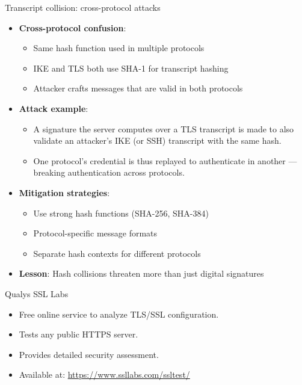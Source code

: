 \ifdefined\PRESENTATION\else\PassOptionsToClass{handout}{beamer}\fi\documentclass[aspectratio=169, lualatex]{beamer}
\begin{document}
\begin{frame}{Transcript collision: cross-protocol attacks}
	\begin{itemize}
		\item \textbf{Cross-protocol confusion}:
		      \begin{itemize}
			      \item Same hash function used in multiple protocols
			      \item IKE and TLS both use SHA-1 for transcript hashing
			      \item Attacker crafts messages that are valid in both protocols
		      \end{itemize}
		\item \textbf{Attack example}:
		      \begin{itemize}
			      \item A signature the server computes over a TLS transcript is made to also validate an attacker's IKE (or SSH) transcript with the same hash.
			      \item One protocol's credential is thus replayed to authenticate in another --- breaking authentication across protocols.
		      \end{itemize}
		\item \textbf{Mitigation strategies}:
		      \begin{itemize}
			      \item Use strong hash functions (SHA-256, SHA-384)
			      \item Protocol-specific message formats
			      \item Separate hash contexts for different protocols
		      \end{itemize}
		\item \textbf{Lesson}: Hash collisions threaten more than just digital signatures
	\end{itemize}
\end{frame}

\begin{frame}{Qualys SSL Labs}
	\begin{itemize}
		\item Free online service to analyze TLS/SSL configuration.
		\item Tests any public HTTPS server.
		\item Provides detailed security assessment.
		\item Available at: \url{https://www.ssllabs.com/ssltest/}
	\end{itemize}
\end{frame}
\end{document}
